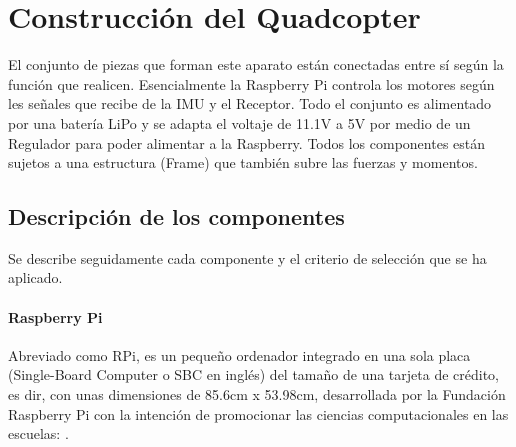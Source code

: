 \documentclass[twoside,11pt]{book}
\begin{document}
\newpage
\chapter{Construcción del Quadcopter} \label{construc}
El conjunto de piezas que forman este aparato están conectadas entre sí según la función que realicen. Esencialmente la Raspberry Pi controla los motores según les señales que recibe de la IMU y el Receptor. Todo el conjunto es alimentado por una batería LiPo y se adapta el voltaje de 11.1V a 5V por medio de un Regulador para poder alimentar a la Raspberry. Todos los componentes están sujetos a una estructura (Frame) que también subre las fuerzas y momentos.  

\section{Descripción de los componentes}
Se describe seguidamente cada componente y el criterio de selección que se ha aplicado.
\subsubsection*{Raspberry Pi} 
Abreviado como RPi, es un pequeño ordenador integrado en una sola placa (Single-Board Computer o SBC en inglés) del tamaño de una tarjeta de crédito, es dir, con unas dimensiones de 85.6cm x 53.98cm, desarrollada por la Fundación Raspberry Pi con la intención de promocionar las ciencias computacionales en las escuelas: \cite{RPiWiki}. 
\end{document}
